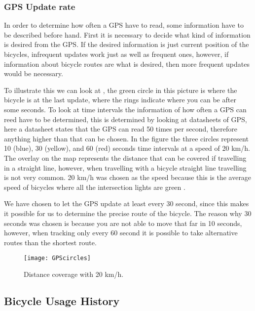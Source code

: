 \subsubsection{GPS Update rate}
In order to determine how often a GPS have to read, some information have to be described before hand.
First it is necessary to decide what kind of information is desired from the GPS.
If the desired information is just current position of the bicycles, infrequent updates work just as well as frequent ones, however, if information about bicycle routes are what is desired, then more frequent updates would be necessary.

To illustrate this we can look at , the green circle in this picture is where the bicycle is at the last update, where the rings indicate where you can be after some seconds.
To look at time intervals the information of how often a GPS can reed have to be determined, this is determined by looking at datasheets of GPS, here a datasheet \citep{manual:gpsDataSheet} states that the GPS can read 50 times per second, therefore anything higher than that can be chosen.
In the figure the three circles represent 10 (blue), 30  (yellow), and 60 (red) seconds time intervals at a speed of 20 km/h.
The overlay on the map represents the distance that can be covered if travelling in a straight line, however, when travelling with a bicycle straight line travelling is not very common.
20 km/h was chosen as the speed because this is the average speed of bicycles where all the intersection lights are green \citep{misc:bicycleStatistics}.

We have chosen to let the GPS update at least every 30 second, since this makes it possible for us to determine the precise route of the bicycle.
The reason why 30 seconds was chosen is because you are not able to move that far in 10 seconds, however, when tracking only every 60 second it is possible to take alternative routes than the shortest route.


\begin{figure}
	\centering
	\texttt{[image: GPScircles]}
	\caption{Distance coverage with 20 km/h.}
	\label{fig:gpsCircles}
\end{figure}

\subsection{Bicycle Usage History}\label{sec:bicycleUsageHistory}

